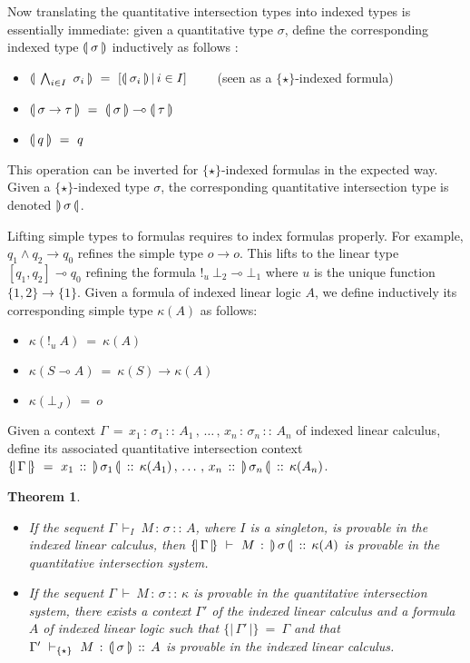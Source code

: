 \documentclass{eptcs}
\newcommand{\translation}[1]{\{\!\vert \, #1 \, \vert\!\}}
\newcommand{\indexedtype}[1]{(\hspace{-.195em}\vert \, #1 \, \vert\hspace{-.195em})}
\newcommand{\indexedtyperev}[1]{ \vert\hspace{-.195em}) \, #1 \, (\hspace{-.195em}\vert}
\newtheorem{theorem}{Theorem}
\begin{document}
Now translating the quantitative intersection types into indexed types is essentially immediate: given a quantitative type $\sigma$, define the corresponding indexed type $\indexedtype{\sigma}$ inductively as follows :
\begin{itemize}
\item $\indexedtype{\bigwedge_{i \in I}\ \sigma_i}\ =\ [\indexedtype{\sigma_i}\,\vert\, i \in I]\quad \quad$ (seen as a $\{\star \}$-indexed formula)
\item $\indexedtype{\sigma \rightarrow \tau}\ =\ \indexedtype{\sigma} \multimap \indexedtype{\tau}$
\item $\indexedtype{q}\ =\ q$
\end{itemize}
This operation can be inverted for $\{\star \}$-indexed formulas in the expected way.
Given a $\{\star\}$-indexed type $\sigma$, the corresponding quantitative intersection type is denoted $\indexedtyperev{\sigma}$.


 Lifting simple types to formulas requires to index formulas properly. For example, $q_1 \wedge q_2 \rightarrow q_0$ refines the simple type $o \rightarrow o$. This lifts to the linear type $[q_1, q_2] \multimap q_0$ refining the formula $!_u\ \bot_2 \multimap \bot_1$ where $u$ is the unique function $\{1,2\} \rightarrow \{1\}$. Given a formula of indexed linear logic $A$, we define inductively its corresponding simple type $\kappa(A)$ as follows:
\begin{itemize}
\item $\kappa(!_u\ A) \ =\ \kappa(A)$
\item $\kappa(S \multimap A)\ = \ \kappa(S) \rightarrow \kappa(A)$
\item $\kappa(\bot_J)\ =\ o$
\end{itemize}

Given a context $\Gamma\,=\,x_1 \,:\,\sigma_1\,::\,A_1\,,\,\ldots\,,\, x_n \,:\,\sigma_n\,::\,A_n$ of indexed linear calculus, define its associated quantitative intersection context $\translation{\Gamma}\ =\ x_1\,::\,\indexedtyperev{\sigma_1}\,::\,\kappa(A_1)\,,\,\ldots\,,\,x_n\,::\,\indexedtyperev{\sigma_n}\,::\,\kappa(A_n)$.\\


\begin{theorem}\label{theorem/comparison}
\begin{itemize}
\item If the sequent $\Gamma\ \vdash_I\ M\,:\,\sigma\,::\,A$, where $I$ is a singleton, is provable in the indexed linear calculus, then $\translation{\Gamma}\ \vdash\ M\,:\,\indexedtyperev{\sigma}\,::\,\kappa(A)$ is provable in the quantitative intersection system.
\item  If the sequent $\Gamma\ \vdash\ M\,:\,\sigma\,::\,\kappa$ is provable in the quantitative intersection system, there exists a context $\Gamma'$ of the indexed linear calculus and a formula $A$ of indexed linear logic such that $\translation{\Gamma'}\ =\ \Gamma$ and that $\Gamma'\ \vdash_{\{\star\}}\ M\,:\,\indexedtype{\sigma}\,::\,A$ is provable in the indexed linear calculus.
\end{itemize}
\end{theorem}
\end{document}
